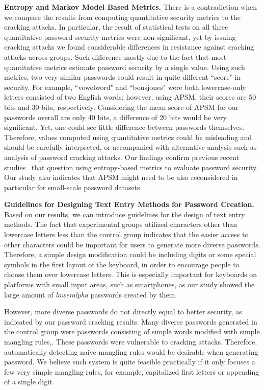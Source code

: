 \documentclass[conference]{IEEEtran}
\begin{document}
\textbf{Entropy and Markov Model Based Metrics.} There is a contradiction when we compare the results from computing quantitative security metrics to the cracking attacks. In particular, the result of statistical tests on all three quantitative password security metrics were non-significant, yet by issuing cracking attacks we found considerable differences in resistance against cracking attacks across groups. Such difference mostly due to the fact that most quantitative metrics estimate password security by a single value. Using such metrics, two very similar passwords could result in quite different ``score" in security. For example, ``vowelword" and ``bonsjones" were both lowercase-only letters consisted of two English words; however, using APSM, their scores are 50 bits and 30 bits, respectively. Considering the mean score of APSM for our passwords overall are only 40 bits, a difference of 20 bits would be very significant. Yet, one could see little difference between passwords themselves. Therefore, values computed using quantitative metrics could be misleading and should be carefully interpreted, or accompanied with alternative analysis such as analysis of password cracking attacks. Our findings confirm previous recent studies~\cite{Weir:2010:TMP:1866307.1866327, Bonneau:2012:SGA:2310656.2310721} that question using entropy-based metrics to evaluate password security. Our study also indicates that APSM might need to be also reconsidered in particular for small-scale password datasets.



\textbf{Guidelines for Designing Text Entry Methods for Password Creation.} Based on our results, we can introduce guidelines for the design of text entry methods. The fact that experimental groups utilized characters other than lowercase letters less than the control group indicates that the easier access to other characters could be important for users to generate more diverse passwords. Therefore, a simple design modification could be including digits or some special symbols in the first layout of the keyboard, in order to encourage people to choose them over lowercase letters. This is especially important for keyboards on platforms with small input areas, such as smartphones, as our study showed the large amount of \emph{loweralpha} passwords created by them.

However, more diverse passwords do not directly equal to better security, as indicated by our password cracking results. Many diverse passwords generated in the control group were passwords consisting of simple words modified with simple mangling rules,. These passwords were vulnerable to cracking attacks. Therefore, automatically detecting naive mangling rules would be desirable when generating password. We believe such system is quite feasible practically if it only focuses a few very simple mangling rules, for example, capitalized first letters or appending of a single digit.
\end{document}
